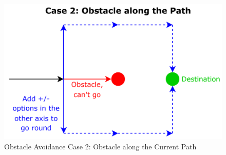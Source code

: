 \begin{figure} [H]
    \centering
    \includegraphics[width=0.75\linewidth]{assets/images/formation/obstacle-avoidance-case2.png}
    \caption{Obstacle Avoidance Case 2: Obstacle along the Current Path}
    \label{fig:obstacle-avoidance-case-2}
\end{figure}

